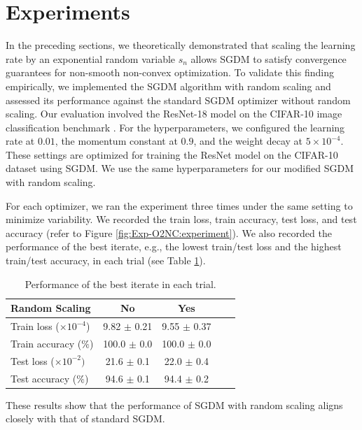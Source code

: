 \section{Experiments}
\label{sec:Exp-O2NC_experiment}

In the preceding sections, we theoretically demonstrated that scaling the learning rate by an exponential random variable $s_n$ allows SGDM to satisfy convergence guarantees for non-smooth non-convex optimization. To validate this finding empirically, we implemented the SGDM algorithm with random scaling and assessed its performance against the standard SGDM optimizer without random scaling. Our evaluation involved the ResNet-18 model \cite{he2016deep} on the CIFAR-10 image classification benchmark \cite{krizhevsky2009learning}. For the hyperparameters, we configured the learning rate at $0.01$, the momentum constant at $0.9$, and the weight decay at $5 \times 10^{-4}$. These settings are optimized for training the ResNet model on the CIFAR-10 dataset using SGDM. We use the same hyperparameters for our modified SGDM with random scaling. 

For each optimizer, we ran the experiment three times under the same setting to minimize variability. We recorded the train loss, train accuracy, test loss, and test accuracy (refer to Figure \ref{fig:Exp-O2NC:experiment}). We also recorded the performance of the best iterate, e.g., the lowest train/test loss and the highest train/test accuracy, in each trial (see Table \ref{tab:Exp-O2NC:1}).

\begin{table}[h]
\caption{Performance of the best iterate in each trial.}
\label{tab:Exp-O2NC:1}
\vskip 0.15in
\begin{center}
\begin{small}
\begin{sc}
\begin{tabular}{lcccr}
\toprule
Random Scaling & No & Yes  \\
\midrule
Train loss ($\times10^{-4}$)     & 9.82 $\pm$ 0.21  & 9.55 $\pm$ 0.37 \\
Train accuracy ($\%$)            & 100.0 $\pm$ 0.0  & 100.0 $\pm$ 0.0 \\
Test loss ($\times10^{-2})$      & 21.6 $\pm$ 0.1   & 22.0 $\pm$ 0.4 \\
Test accuracy ($\%$)             & 94.6 $\pm$ 0.1   & 94.4 $\pm$ 0.2 \\
\bottomrule
\end{tabular}
\end{sc}
\end{small}
\end{center}
\vskip -0.1in
\end{table}

These results show that the performance of SGDM with random scaling aligns closely with that of standard SGDM. 
